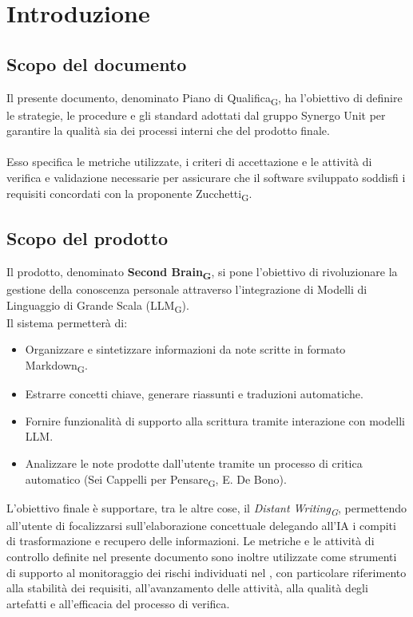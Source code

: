 \section{Introduzione}

\subsection{Scopo del documento}
Il presente documento, denominato Piano di Qualifica\textsubscript{G}, ha l'obiettivo di definire le strategie, le procedure e gli standard adottati dal gruppo Synergo Unit per garantire la qualità sia dei processi interni che del prodotto finale. \\ \\
Esso specifica le metriche utilizzate, i criteri di accettazione e le attività di verifica e validazione necessarie per assicurare che il software sviluppato soddisfi i requisiti concordati con la proponente Zucchetti\textsubscript{G}.

\subsection{Scopo del prodotto}
Il prodotto, denominato \textbf{Second Brain\textsubscript{G}}, si pone l'obiettivo di rivoluzionare la gestione della conoscenza personale attraverso l'integrazione di Modelli di Linguaggio di Grande Scala (LLM\textsubscript{G}). \\
Il sistema permetterà di:
\begin{itemize}
	\item Organizzare e sintetizzare informazioni da note scritte in formato Markdown\textsubscript{G}.
	\item Estrarre concetti chiave, generare riassunti e traduzioni automatiche.
	\item Fornire funzionalità di supporto alla scrittura tramite interazione con modelli LLM.
	\item Analizzare le note prodotte dall'utente tramite un processo di critica automatico (Sei Cappelli per Pensare\textsubscript{G}, E. De Bono).
\end{itemize}
L'obiettivo finale è supportare, tra le altre cose, il 
\textit{Distant Writing\textsubscript{G}}, permettendo all'utente di 
focalizzarsi sull'elaborazione concettuale delegando all'IA i compiti di 
trasformazione e recupero delle informazioni.
Le metriche e le attività di controllo definite nel presente documento 
sono inoltre utilizzate come strumenti di supporto al monitoraggio dei rischi individuati nel , 
con particolare riferimento alla stabilità dei requisiti, 
all'avanzamento delle attività, alla qualità degli artefatti e 
all'efficacia del processo di verifica.

